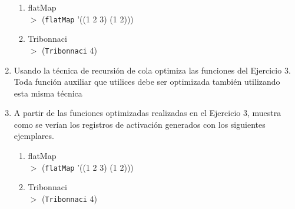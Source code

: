 \documentclass[11pt]{article}
\begin{document}
\begin{enumerate}[leftmargin=0.8cm]
    \begin{enumerate}
        \item flatMap\\
        $>$ (\texttt{flatMap} '((1 2 3) (1 2))) 
        \item Tribonnaci\\
        $>$ (\texttt{Tribonnaci} 4)\\
    \end{enumerate}
    \item Usando la técnica de recursión de cola optimiza las funciones del Ejercicio 3. Toda función auxiliar que utilices debe ser optimizada también utilizando esta misma técnica
    \item A partir de las funciones optimizadas realizadas en el Ejercicio 3, muestra como se verían los registros de activación generados con los siguientes ejemplares.
    \begin{enumerate}
        \item flatMap\\
        $>$ (\texttt{flatMap} '((1 2 3) (1 2)))
        \item Tribonnaci\\
        $>$ (\texttt{Tribonnaci} 4)\\
    \end{enumerate}
\end{enumerate}
\end{document}
